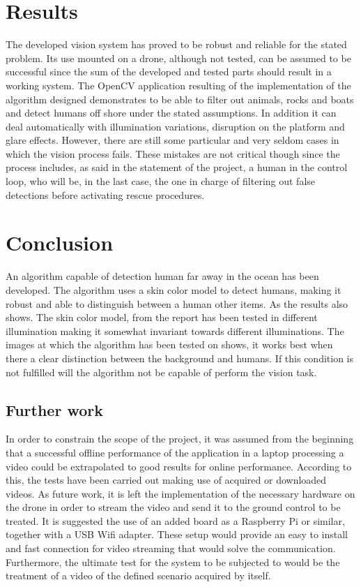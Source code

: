 \section{Results}
The developed vision system has proved to be robust and reliable for the stated problem.
Its use mounted on a drone, although not tested, can be assumed to be successful since the sum of the developed and tested parts should result in a working system.
The OpenCV application resulting of the implementation of the algorithm designed demonstrates to be able to filter out animals, rocks and boats and detect humans off shore under the stated assumptions. 
In addition it can deal automatically with illumination variations, disruption on the platform and glare effects.
However, there are still some particular and very seldom cases in which the vision process fails. 
These mistakes are not critical though since the process includes, as said in the statement of the project, a human in the control loop, who will be, in the last case, the one in charge of filtering out false detections before activating rescue procedures.

\section{Conclusion}

An algorithm capable of detection human far away in the ocean has been developed.  The algorithm uses a skin color model to detect humans, making it robust and able to distinguish between a human other items.   As the results also shows.  The skin color model, from the report \cite{Ref:SkinDetection} has been tested in different illumination making it somewhat invariant towards different illuminations. The images at which the algorithm has been tested on shows, it works best when there a clear distinction between the background and humans.  If this condition is not fulfilled will the algorithm not be capable of perform the vision task. 


\subsection{Further work} 
In order to constrain the scope of the project, it was assumed from the beginning that a successful offline performance of the application in a laptop processing a video could be extrapolated to good results for online performance. 
According to this, the tests have been carried out making use of acquired or downloaded videos.
As future work, it is left the implementation of the necessary hardware on the drone in order to stream the video and send it to the ground control to be treated.
It is suggested the use of an added board as a Raspberry Pi or similar, together with a USB Wifi adapter. These setup would provide an easy to install and fast connection for video streaming that would solve the communication.
Furthermore, the ultimate test for the system to be subjected to would be the treatment of a video of the defined scenario acquired by itself. 



\newpage
